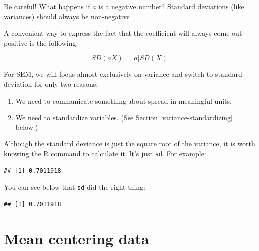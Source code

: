 \documentclass[
]{book}
\newenvironment{Shaded}{\begin{snugshade}}{\end{snugshade}}
\newcommand{\FunctionTok}[1]{\textcolor[rgb]{0.00,0.00,0.00}{#1}}
\newcommand{\NormalTok}[1]{#1}
\newcommand{\SpecialCharTok}[1]{\textcolor[rgb]{0.00,0.00,0.00}{#1}}
\providecommand{\tightlist}{%
  \setlength{\itemsep}{0pt}\setlength{\parskip}{0pt}}
\begin{document}
Be careful! What happens if \(a\) is a negative number? Standard deviations (like variances) should always be non-negative.

A convenient way to express the fact that the coefficient will always come out positive is the following:

\[
SD(aX) = \left| a \right| SD(X)
\]

For SEM, we will focus almost exclusively on variance and switch to standard deviation for only two reasons:

\begin{enumerate}
\def\labelenumi{\arabic{enumi}.}
\tightlist
\item
  We need to communicate something about spread in meaningful units.
\item
  We need to standardize variables. (See Section \ref{variance-standardizing} below.)
\end{enumerate}

Although the standard deviance is just the square root of the variance, it is worth knowing the R command to calculate it. It's just \texttt{sd}. For example:

\begin{Shaded}
\end{Shaded}

\begin{verbatim}
## [1] 0.7011918
\end{verbatim}

You can see below that \texttt{sd} did the right thing:

\begin{Shaded}
\end{Shaded}

\begin{verbatim}
## [1] 0.7011918
\end{verbatim}

\hypertarget{variance-mean-centering}{%
\section{Mean centering data}\label{variance-mean-centering}}
\end{document}
